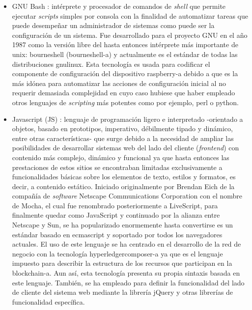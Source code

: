 \documentclass[12pt,a4paper, twoside]{report}
\begin{document}
	\begin{itemize}
		\item GNU Bash \cite{bash}: intérprete y procesador de comandos de \textit{\gls{shell}} que permite ejecutar \textit{\glspl{script}} simples por consola con la finalidad de automatizar tareas que puede desempeñar un administrador de sistemas como puede ser la configuración de un sistema. Fue desarrollado para el proyecto GNU en el año 1987 como la versión libre del hasta entonces intérprete más importante de \gls{unix}: \gls{bourneshell} (\gls{bourneshell-a}) y actualmente es el estándar de todas las distribuciones \gls{gnulinux}. Esta tecnología es usada para codificar el componente de configuración del dispositivo \gls{raspberry-a} debido a que es la más idónea para automatizar las acciones de configuración inicial al no requerir demasiada complejidad en cuyo caso hubiese que haber empleado otros lenguajes de \textit{scripting} más potentes como por ejemplo, \gls{perl} o \gls{python}.
		 	
		\item Javascript (JS) \cite{javascript}: lenguaje de programación ligero e interpretado -orientado a objetos, basado en prototipos, imperativo, débilmente tipado y dinámico, entre otras características- que surge debido a la necesidad de ampliar las posibilidades de desarrollar sistemas web del lado del cliente (\textit{\gls{frontend}}) con contenido más complejo, dinámico y funcional ya que hasta entonces las prestaciones de estos sitios se encontraban limitadas exclusivamente a funcionalidades básicas sobre los elementos de texto, estilos y formatos, es decir, a contenido estático. Iniciado originalmente por Brendan Eich de la compañía de \textit{software} Netscape Communications Corporation con el nombre de Mocha, el cual fue renombrado posteriormente a LiveScript, para finalmente quedar como JavaScript y continuado por la alianza entre Netscape y Sun, se ha popularizado enormemente hasta convertirse es un estándar basado en \gls{ecmascript} y soportado por todos los navegadores actuales. El uso de este lenguaje se ha centrado en el desarrollo de la red de negocio con la tecnología \gls{hyperledgercomposer-a} ya que es el lenguaje impuesto para describir la estructura de los recursos que participan en la \gls{blockchain-a}. Aun así, esta tecnología presenta su propia sintaxis basada en este lenguaje. También, se ha empleado para definir la funcionalidad del lado de cliente del sistema web mediante la librería jQuery y otras librerías de funcionalidad específica.
		

\end{itemize}
\end{document}
